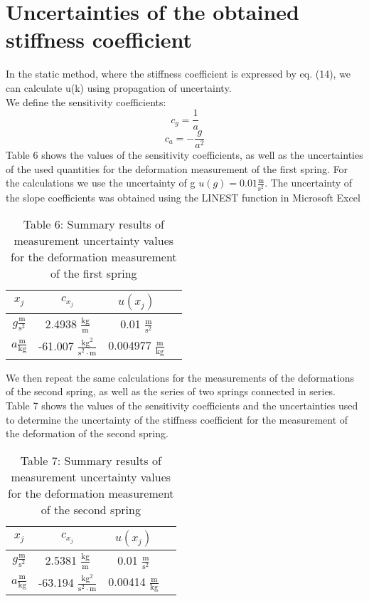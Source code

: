 \documentclass{article}
\begin{document}
\section{Uncertainties of the obtained stiffness coefficient}
In the static method, where the stiffness coefficient is expressed by eq. (14), we can calculate u(k) using propagation of uncertainty. \\
We define the sensitivity coefficients:
\begin{equation}
    c_g = \frac{1}{a}
\end{equation}
\begin{equation}
    c_a = -\frac{g}{a^2}
\end{equation}
Table 6 shows the values of the sensitivity coefficients, as well as the uncertainties of the used quantities for the deformation measurement of the first spring. For the calculations we use the uncertainty of g \(u(g) = 0.01 \mathrm{\frac{m}{s^2}}\). The uncertainty of the slope coefficients was obtained using the LINEST function in Microsoft Excel
\begin{table}[h!]
\centering
\caption{Table 6: Summary results of measurement uncertainty values for the deformation measurement of the first spring}
\begin{tabular}{|c|c|c|c|}
\hline
\textbf{\(x_j\)} & \textbf{\(c_{x_j}\)} & \textbf{\(u(x_j)\)} \\ \hline
\(g \mathrm{\frac{m}{s^2}}\) & 2.4938 \(\mathrm{\frac{kg}{m}}\) & 0.01 \(\mathrm{\frac{m}{s^2}}\) \\ \hline
\(a \mathrm{\frac{m}{kg}}\) & -61.007 \(\mathrm{\frac{kg^2}{s^2 \cdot m}}\) & 0.004977 \(\mathrm{\frac{m}{kg}}\) \\ \hline
\end{tabular}
\end{table}
We then repeat the same calculations for the measurements of the deformations of the second spring, as well as the series of two springs connected in series. \\ 
Table 7 shows the values of the sensitivity coefficients and the uncertainties used to determine the uncertainty of the stiffness coefficient for the measurement of the deformation of the second spring. \\
\begin{table}[h!]
\centering
\caption{Table 7: Summary results of measurement uncertainty values for the deformation measurement of the second spring}
\begin{tabular}{|c|c|c|c|}
\hline
\textbf{\(x_j\)} & \textbf{\(c_{x_j}\)} & \textbf{\(u(x_j)\)} \\ \hline
\(g \mathrm{\frac{m}{s^2}}\) & 2.5381 \(\mathrm{\frac{kg}{m}}\) & 0.01 \(\mathrm{\frac{m}{s^2}}\) \\ \hline
\(a \mathrm{\frac{m}{kg}}\) & -63.194 \(\mathrm{\frac{kg^2}{s^2 \cdot m}}\) & 0.00414 \(\mathrm{\frac{m}{kg}}\) \\ \hline
\end{tabular}
\end{table}\\
\end{document}
